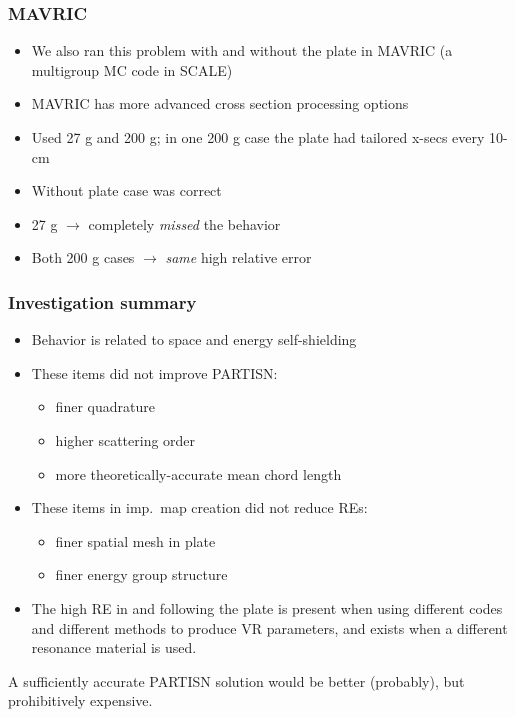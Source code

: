 \documentclass[xcolor=x11names,compress]{beamer}
\renewcommand{\(}{\begin{columns}}
\renewcommand{\)}{\end{columns}}
\newcommand{\<}[1]{\begin{column}{#1}}
\renewcommand{\>}{\end{column}}
\begin{document}
\begin{frame}[fragile]
  \frametitle{MAVRIC}
  
  \begin{itemize}
  \item We also ran this problem with and without the plate in MAVRIC (a multigroup MC code in SCALE)
  \item MAVRIC has more advanced cross section processing options
  \item Used 27 g and 200 g; in one 200 g case the plate had tailored x-secs every 10-cm \vspace*{0.5em}
  \pause
  \item Without plate case was correct
  \item 27 g $\rightarrow$ completely \textit{missed} the behavior
  \item Both 200 g cases $\rightarrow$ \textit{same} high relative error
  \end{itemize}
  
\end{frame}


\begin{frame}[fragile]
  \frametitle{Investigation summary}
  
	\begin{itemize}
	\item Behavior is related to space and energy self-shielding
	\pause
	\item These items did not improve PARTISN:
	 \begin{itemize}
	 \item finer quadrature
	 \item higher scattering order
	 \item more theoretically-accurate mean chord length
	 \end{itemize}
	\pause 
	\item These items in imp.\ map creation did not reduce REs:
	 \begin{itemize}
	 \item finer spatial mesh in plate
	 \item finer energy group structure
	 \end{itemize}
	\pause 
	\item The high RE in and following the plate is present when using different codes and different methods to produce VR parameters, and exists when a different resonance material is used.
	\end{itemize}


A sufficiently accurate PARTISN solution would be better (probably), but prohibitively expensive.
  
\end{frame}
\end{document}
